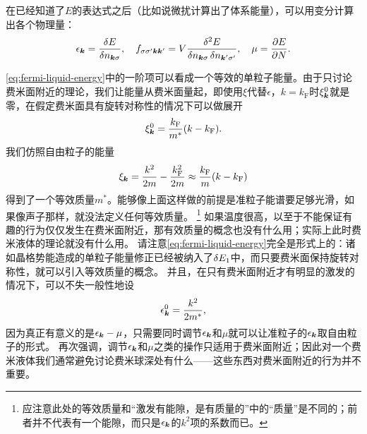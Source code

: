 在已经知道了$E$的表达式之后（比如说微扰计算出了体系能量），可以用变分计算出各个物理量：
\begin{equation}
    \epsilon_{\vb*{k}} = \fdv{E}{n_{\vb*{k} \sigma}} , \quad f_{\sigma \sigma' \vb*{k} \vb*{k}'} = V \frac{\var[2]{E}}{\var{n_{\vb*{k} \sigma}}\var{n_{\vb*{k}' \sigma'}}}, \quad \mu = \pdv{E}{N}.
\end{equation}

\eqref{eq:fermi-liquid-energy}中的一阶项可以看成一个等效的单粒子能量。由于只讨论费米面附近的理论，我们让能量从费米面量起，即使用$\xi$代替$\epsilon$，$k=k_\text{F}$时$\xi^0_{\vb*{k}}$就是零，在假定费米面具有旋转对称性的情况下可以做展开
\[
    \xi^0_{\vb*{k}} = \frac{k_\text{F}}{m^*} (k - k_\text{F}).
\]
我们仿照自由粒子的能量
\[
    \xi_{\vb*{k}} = \frac{k^2}{2m} - \frac{k_\text{F}^2}{2m} \approx \frac{k_\text{F}}{m} (k - k_\text{F})
\]
得到了一个等效质量$m^*$。能够像上面这样做的前提是准粒子能谱要足够光滑，如果像声子那样，就没法定义任何等效质量。%
\footnote{应注意此处的等效质量和“激发有能隙，是有质量的”中的“质量”是不同的；前者并不代表有一个能隙，而只是$\epsilon_{\vb*{k}}$的$k^2$项的系数而已。}%
如果温度很高，以至于不能保证有趣的行为仅仅发生在费米面附近，那有效质量的概念也没有什么用；实际上此时费米液体的理论就没有什么用。
请注意\eqref{eq:fermi-liquid-energy}完全是形式上的：诸如晶格势能造成的单粒子能量修正已经被纳入了$\var{E_1}$中，而只要费米面保持旋转对称性，就可以引入等效质量的概念。
并且，在只有费米面附近才有明显的激发的情况下，可以不失一般性地设
\[
    \epsilon_{\vb*{k}}^0 = \frac{k^2}{2m^*},
\]
因为真正有意义的是$\epsilon_{\vb*{k}} - \mu$，只需要同时调节$\epsilon_{\vb*{k}}$和$\mu$就可以让准粒子的$\epsilon_{\vb*{k}}$取自由粒子的形式。
再次强调，调节$\epsilon_{\vb*{k}}$和$\mu$之类的操作只适用于费米面附近；因此对一个费米液体我们通常避免讨论费米球深处有什么——这些东西对费米面附近的行为并不重要。

